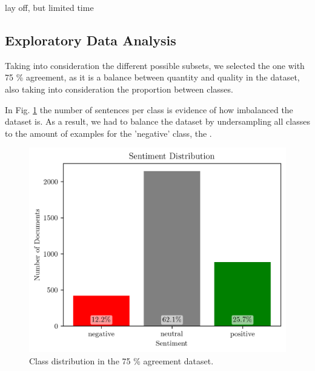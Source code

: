 \documentclass[conference]{IEEEtran}
\begin{document}
lay off, but limited time



\subsection{Exploratory Data Analysis}

Taking into consideration the different possible subsets, we selected the one with 75 \% agreement, as it is a balance between quantity and quality in the dataset, also taking into consideration the proportion between classes.

In Fig. \ref{fig:sentiment_distribution} the number of sentences per class is evidence of how imbalanced the dataset is. As a result, we had to balance the dataset by undersampling all classes to the amount of examples for the 'negative' class, the .


\begin{figure}[H]
    \centering
    \includegraphics[width=1\linewidth]{assets/sentiment_distribution.png}
    \caption{Class distribution in the 75 \% agreement dataset.}
    \label{fig:sentiment_distribution}
\end{figure}
\end{document}
